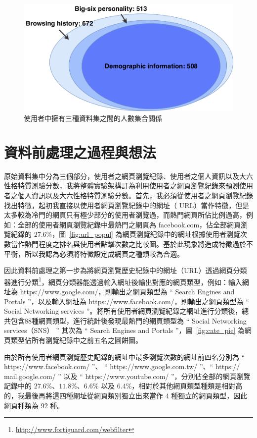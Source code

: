 {\begin{figure}[h]
    \graphicspath{{fig/}}
    \begin{center}
    \includegraphics[scale=0.7]{fig/dataset_distribution.pdf}
    \caption{使用者中擁有三種資料集之間的人數集合關係}
    \label{fig:dataset_distribution}
    \end{center}
\end{figure}
}



\section{資料前處理之過程與想法}
{
原始資料集中分為三個部分，使用者之網頁瀏覽紀錄、使用者之個人資訊以及大六性格特質測驗分數，我將整體實驗架構訂為利用使用者之網頁瀏覽紀錄來預測使用者之個人資訊以及大六性格特質測驗分數。首先，我必須從使用者之網頁瀏覽紀錄找出特徵，起初我直接以使用者網頁瀏覽紀錄中的網址（ URL）當作特徵，但是太多較為冷門的網頁只有極少部分的使用者瀏覽過，而熱門網頁所佔比例過高，例如：全部的使用者網頁瀏覽紀錄中最熱門之網頁為  facebook.com，佔全部網頁瀏覽紀錄的 $27.6\%$，圖~\ref{fig:url_popul} 為網頁瀏覽紀錄中的網址根據使用者瀏覽次數當作熱門程度之排名與使用者點擊次數之比較圖。基於此現象將造成特徵過於不平衡，所以我認為必須將特徵設定成網頁之種類較為合適。\par


因此資料前處理之第一步為將網頁瀏覽歷史紀錄中的網址（URL）透過網頁分類器進行分類\footnote{\url{http://www.fortiguard.com/webfilter}}，網頁分類器能透過輸入網址後輸出對應的網頁類型，例如：輸入網址為 https://www.google.com/，則輸出之網頁類型為 “ Search Engines and Portals ”，以及輸入網址為 https://www.facebook.com/，則輸出之網頁類型為 “ Social Networking services ”。將所有使用者網頁瀏覽紀錄之網址進行分類後，總共包含88種網頁類型，進行統計後發現最熱門的網頁類型為 “ Social Networking services（SNS） ” 其次為 “ Search Engines and Portals ”，圖~\ref{fig:cate_pie} 為網頁類型佔所有瀏覽紀錄中之前五名之圓餅圖。\par

由於所有使用者網頁瀏覽歷史記錄的網址中最多瀏覽次數的網址前四名分別為 “ https://www.facebook.com/ ”、 “ https://www.google.com.tw/ ”、“ https:// mail.google.com/ ” 以及 “ https://www.youtube.com/ ”，分別佔全部的網頁瀏覽記錄中的 $27.6\%$、$11.8\%$、$6.6\%$ 以及 $6.4\%$，相對於其他網頁類型種類是相對高的，我最後再將這四種網址從網頁類別獨立出來當作 4 種獨立的網頁類型，因此網頁種類為 92 種。
}


